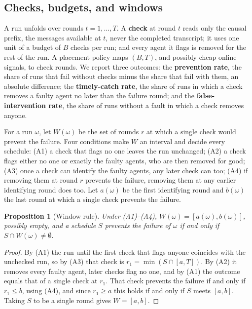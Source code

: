 \documentclass[pdflatex,sn-mathphys-num]{sn-jnl}
\theoremstyle{thmstyleone}%
\newtheorem{proposition}{Proposition}%
\begin{document}
\subsection{Checks, budgets, and windows}
A run unfolds over rounds $t = 1, \dots, T$. A \textbf{check} at round $t$ reads only the causal prefix, the messages available at $t$, never the completed transcript; it uses one unit of a budget of $B$ checks per run; and every agent it flags is removed for the rest of the run. A placement policy maps $(B, T)$, and possibly cheap online signals, to check rounds. We report three outcomes: the \textbf{prevention rate}, the share of runs that fail without checks minus the share that fail with them, an absolute difference; the \textbf{timely-catch rate}, the share of runs in which a check removes a faulty agent no later than the failure round; and the \textbf{false-intervention rate}, the share of runs without a fault in which a check removes anyone.

For a run $\omega$, let $W(\omega)$ be the set of rounds $r$ at which a single check would prevent the failure. Four conditions make $W$ an interval and decide every schedule: (A1) a check that flags no one leaves the run unchanged; (A2) a check flags either no one or exactly the faulty agents, who are then removed for good; (A3) once a check can identify the faulty agents, any later check can too; (A4) if removing them at round $r$ prevents the failure, removing them at any earlier identifying round does too. Let $a(\omega)$ be the first identifying round and $b(\omega)$ the last round at which a single check prevents the failure.

\begin{proposition}[Window rule]
\label{prop:window}
Under (A1)--(A4), $W(\omega) = [a(\omega), b(\omega)]$, possibly empty, and a schedule $S$ prevents the failure of $\omega$ if and only if $S \cap W(\omega) \neq \emptyset$.
\end{proposition}

\begin{proof}
By (A1) the run until the first check that flags anyone coincides with the unchecked run, so by (A3) that check is $r_1 = \min (S \cap [a, T])$. By (A2) it removes every faulty agent, later checks flag no one, and by (A1) the outcome equals that of a single check at $r_1$. That check prevents the failure if and only if $r_1 \le b$, using (A4), and since $r_1 \ge a$ this holds if and only if $S$ meets $[a, b]$. Taking $S$ to be a single round gives $W = [a, b]$.
\end{proof}
\end{document}
